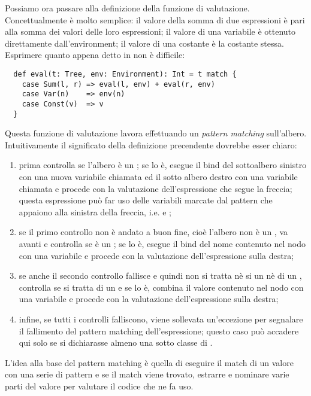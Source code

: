 Possiamo ora passare alla definizione della funzione di valutazione. Concettualmente \`e molto semplice: il valore della somma di due espressioni \`e pari alla somma dei valori delle loro espressioni; il valore di una variabile \`e ottenuto direttamente dall'environment; il valore di una costante \`e la costante stessa. Esprimere quanto appena detto in \Scala non \`e difficile:
\begin{lstlisting}
  def eval(t: Tree, env: Environment): Int = t match {
    case Sum(l, r) => eval(l, env) + eval(r, env)
    case Var(n)    => env(n)
    case Const(v)  => v
  }
\end{lstlisting}
Questa funzione di valutazione lavora effettuando un \emph{pattern matching} sull'albero. Intuitivamente il significato della definizione precendente dovrebbe esser chiaro:
\begin{enumerate}
	\item prima controlla se l'albero  \`e un ; se lo \`e, esegue il bind del sottoalbero sinistro con una nuova variabile chiamata  ed il sotto albero destro con una variabile chiamata  e procede con la valutazione dell'espressione che segue la freccia; questa espressione pu\`o far uso delle variabili marcate dal pattern che appaiono alla sinistra della freccia, i.e.  e ;
	\item se il primo controllo non \`e andato a buon fine, cio\`e l'albero non \`e un , va avanti e controlla se \`e un ; se lo \`e, esegue il bind del nome contenuto nel nodo  con una variabile  e procede con la valutazione dell'espressione sulla destra;
	\item se anche il secondo controllo fallisce e quindi non si tratta n\`e si un  n\`e di un , controlla se si tratta di un  e se lo \`e, combina il valore contenuto nel nodo  con una variabile  e procede con la valutazione dell'espressione sulla destra;
	\item infine, se tutti i controlli falliscono, viene sollevata un'eccezione per segnalare il fallimento del pattern matching dell'espressione; questo caso pu\`o accadere qui solo se si dichiarasse almeno una sotto classe di .
\end{enumerate}
L'idea alla base del pattern matching \`e quella di eseguire il match di un valore con una serie di pattern e se il match viene trovato, estrarre e nominare varie parti del valore per valutare il codice che ne fa uso.

